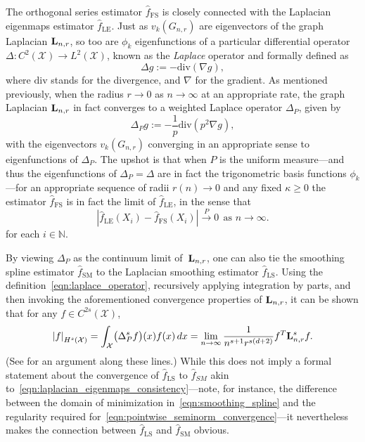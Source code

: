 \documentclass{article}
\newcommand{\abs}[1]{\left \lvert #1 \right \rvert}
\newcommand{\1}{\mathbf{1}}
\newcommand{\Lap}{{\bf L}}
\newcommand{\Xset}{\mathcal{X}}
\newcommand{\Leb}{L}
\newcommand{\wh}[1]{\widehat{#1}}
\newcommand{\LE}{\mathrm{LE}}
\newcommand{\LS}{\mathrm{LS}}
\newcommand{\SM}{\mathrm{SM}}
\newcommand{\OS}{\mathrm{FS}}
\theoremstyle{alden}
\theoremstyle{aldenthm}
\theoremstyle{definition}
\theoremstyle{remark}
\begin{document}
The orthogonal series estimator $\wh{f}_{\OS}$ is closely connected with the Laplacian eigenmaps estimator $\wh{f}_{\LE}$. Just as $v_k(G_{n,r})$ are eigenvectors of the graph Laplacian $\Lap_{n,r}$, so too are $\phi_k$ eigenfunctions of a particular differential operator $\Delta: C^2(\Xset) \to \Leb^2(\Xset)$, known as the \emph{Laplace} operator and formally defined as
\begin{equation}
\label{eqn:laplace_operator}
\Delta g := -\mathrm{div}(\nabla g),
\end{equation}
where $\mathrm{div}$ stands for the divergence, and $\nabla$ for the gradient. As mentioned previously, when the radius $r \to 0$ as $n \to \infty$ at an appropriate rate, the graph Laplacian $\Lap_{n,r}$ in fact converges to a weighted Laplace operator $\Delta_P$, given by
\begin{equation}
\label{eqn:laplace_operator_weighted}
\Delta_{P} g := -\frac{1}{p}\mathrm{div}(p^2 \nabla g),
\end{equation}
with the eigenvectors $v_k(G_{n,r})$ converging in an appropriate sense to eigenfunctions of $\Delta_{P}$. The upshot is that when $P$ is the uniform measure---and thus the eigenfunctions of $\Delta_P = \Delta$ are in fact the trigonometric basis functions $\phi_k$---for an appropriate sequence of radii $r(n) \to 0$ and any fixed $\kappa \geq 0$ the estimator $\wh{f}_{\OS}$ is in fact the limit of $\wh{f}_{\LE}$, in the sense that
\begin{equation}
\label{eqn:laplacian_eigenmaps_consistency}
\abs{\wh{f}_{\LE}(X_i) - \wh{f}_{\OS}(X_i)} \overset{P}{\to} 0~~\textrm{as $n \to \infty$.}
\end{equation} 
for each $i \in \mathbb{N}$.

By viewing $\Delta_P$ as the continuum limit of~$\Lap_{n,r}$, one can also tie the smoothing spline estimator $\wh{f}_{\SM}$ to the Laplacian smoothing estimator $\wh{f}_{\LS}$. Using the definition~\eqref{eqn:laplace_operator}, recursively applying integration by parts, and then invoking the aforementioned convergence properties of $\Lap_{n,r}$, it can be shown that for any $f \in C^{2s}(\Xset)$,
\begin{equation}
\label{eqn:pointwise_seminorm_convergence}
\abs{f}_{H^s(\Xset)} = \int_{\Xset} \bigl(\Delta_P^sf\bigr)(x) f(x) \,dx = \lim_{n \to \infty} \frac{1}{n^{s + 1}r^{s(d + 2)}}f^T \Lap_{n,r}^s f.
\end{equation}
(See \citet{zhou11} for an argument along these lines.)
While this does not imply a formal statement about the convergence of $\wh{f}_{\LS}$ to $\wh{f}_{SM}$ akin to~\eqref{eqn:laplacian_eigenmaps_consistency}---note, for instance, the difference between the domain of minimization in~\eqref{eqn:smoothing_spline} and the regularity required for~\eqref{eqn:pointwise_seminorm_convergence}---it nevertheless makes the connection between $\wh{f}_{\LS}$ and $\wh{f}_{\SM}$ obvious.
\end{document}
